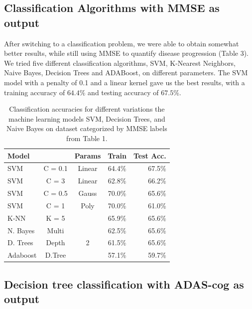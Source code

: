 \documentclass{article}
\begin{document}
\subsection{Classification Algorithms with MMSE as output}
After switching to a classification problem, we were able to obtain somewhat better results, while still using MMSE to quantify disease progression (Table 3). We tried five different classification algorithms, SVM, K-Nearest Neighbors, Naive Bayes, Decision Trees and ADABoost, on different parameters. The SVM  model with a penalty of 0.1 and a linear kernel gave us the best results, with a training accuracy of $64.4\%$ and testing accuracy of $67.5\%$. 
\begin{table}[h]
\caption{Classification accuracies for different variations the machine learning models SVM, Decision Trees, and Naive Bayes on dataset categorized by MMSE labels from Table 1.}
\label{sample-table}
\vskip 0.15in
\begin{center}
\begin{small}
\begin{sc}
\begin{tabular}{lcccr}
\hline
\abovespace\belowspace
Model & & Params & Train & Test Acc. \\
\hline
\abovespace
SVM    & C = 0.1 & Linear & 64.4\% & 67.5\% \\
SVM    & C = 3 & Linear & 62.8\% & 66.2\% \\
SVM    & C = 0.5 & Gauss & 70.0\% & 65.6\% \\
SVM    & C = 1 & Poly & 70.0\% & 61.0\% \\
K-NN    & K = 5 && 65.9\% & 65.6\% \\
N. Bayes    &Multi& & 62.5\% & 65.6\% \\
D. Trees    &Depth & 2 & 61.5\% & 65.6\% \\
\belowspace
Adaboost    & D.Tree  &  & 57.1\% & 59.7\% \\
\hline
\end{tabular}
\end{sc}
\end{small}
\end{center}
\vskip -0.1in
\end{table}

\subsection{Decision tree classification with ADAS-cog as output}
\end{document}
